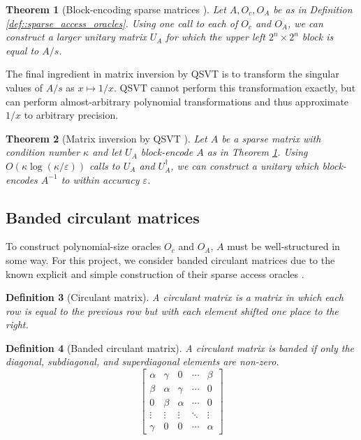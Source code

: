 \documentclass[10pt, twocolumn]{article}
\newtheorem{theorem}{Theorem}[section]
\newtheorem{definition}[theorem]{Definition}
\begin{document}
\begin{theorem}[Block-encoding sparse matrices \cite{gilyen2019quantum, camps2203explicit}]
	\label{thm:block_encoding_sparse_matrices}
	Let $A, O_c, O_A$ be as in Definition \ref{def::sparse_access_oracles}. Using one call to each of $O_c$ and $O_A$, we can construct a larger unitary matrix $U_A$ for which the upper left $2^n \times 2^n$ block is equal to $A/s$.
\end{theorem}

The final ingredient in matrix inversion by QSVT is to transform the singular values of $A/s$ as $x \mapsto 1/x$. QSVT cannot perform this transformation exactly, but can perform almost-arbitrary polynomial transformations \cite{sunderhauf2023generalized} and thus approximate $1/x$ to arbitrary precision.

\begin{theorem}[Matrix inversion by QSVT \cite{gilyen2019quantum}]
	Let $A$ be a sparse matrix with condition number $\kappa$ and let $U_A$ block-encode $A$ as in Theorem \ref{thm:block_encoding_sparse_matrices}. Using $O(\kappa \log(\kappa / \varepsilon))$ calls to $U_A$ and $U_A^\dag$, we can construct a unitary which block-encodes $A^{-1}$ to within accuracy $\varepsilon$.
\end{theorem}

\subsection{Banded circulant matrices}

To construct polynomial-size oracles $O_c$ and $O_A$, $A$ must be well-structured in some way. For this project, we consider banded circulant matrices due to the known explicit and simple construction of their sparse access oracles \cite{camps2203explicit}.

\begin{definition}[Circulant matrix]
	A circulant matrix is a matrix in which each row is equal to the previous row but with each element shifted one place to the right.
\end{definition}

\begin{definition}[Banded circulant matrix]
	A circulant matrix is banded if only the diagonal, subdiagonal, and superdiagonal elements are non-zero.
	\[
		\begin{bmatrix}
			\alpha & \gamma & 0 & \cdots & \beta \\
			\beta & \alpha & \gamma & \cdots & 0 \\
			0 & \beta & \alpha & \cdots & 0 \\
			\vdots & \vdots & \vdots & \ddots & \vdots \\
			\gamma & 0 & 0 & \cdots & \alpha
		\end{bmatrix}
	\]
\end{definition}

\newpage

\printbibliography
\end{document}
